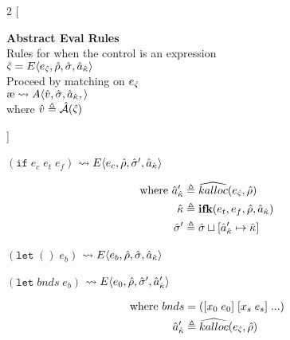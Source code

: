 \documentclass[12pt,draft]{article}
\newcommand\mae{\ensuremath{\text{\ae}}}
\newcommand{\ifsyn}[3]{(\texttt{if}\;#1\;#2\;#3)}
\newcommand{\E}[4]{E\langle #1 , #2 , #3 , #4 \rangle}
\newcommand{\A}[4]{A\langle #1 , #2 , #3 , #4 \rangle}
\begin{document}
\newpage
\footnotesize{
\begin{multicols*}{2}
[
\begin{center}
\textbf{Abstract Eval Rules} \\
Rules for when the control is an expression \\
\vspace{2mm}
$\hat{\varsigma} = \E{\ectrl}{\aenv}{\astore}{\akaddr}$ \\
Proceed by matching on $e_{\hat{\varsigma}}$ \\
\vspace{2mm}
$\mae \leadsto \A{\aval}{\astore}{\akaddr}{}$ \\
where $\hat{v} \triangleq \hat{\mathcal{A}}(\hat{\varsigma})$
\end{center}
]
\begin{center}
  $ \ifsyn{e_c}{e_t}{e_f} $
  $\leadsto \E{e_c}{\aenv}{\astore'}{\akaddr}$
\end{center}
\vspace{-7mm}
\begin{align*}
  \text{where } \hat{a}_{\hat{\kappa}}' &\triangleq \widehat{kalloc}(e_{\hat{\varsigma}} , \hat{\rho}) \\
  \hat{\kappa} &\triangleq \textbf{ifk}(e_t, e_f, \hat{\rho} , \hat{a}_{\hat{\kappa}}) \\
  \hat{\sigma}' &\triangleq \hat{\sigma} \sqcup [\hat{a}_{\hat{\kappa}}' \mapsto \hat{\kappa}]
\end{align*}
\begin{center}
  $(\texttt{let}\;()\;e_b)$
  $\leadsto \E{e_b}{\aenv}{\astore}{\akaddr}$
\end{center}
\begin{center}
  $(\texttt{let}\;bnds\;e_b)$
  $\leadsto \E{e_0}{\aenv}{\astore'}{\akaddr'}$
\end{center}
\vspace{-7mm}
\begin{align*}
  \text{where }
  bnds &= ([x_0\;e_0]\;[x_s\;e_s]\;...) \\
  \akaddr' &\triangleq \akalloc{\ectrl , \aenv} \\

\end{align*}
\end{multicols*}}
\end{document}
